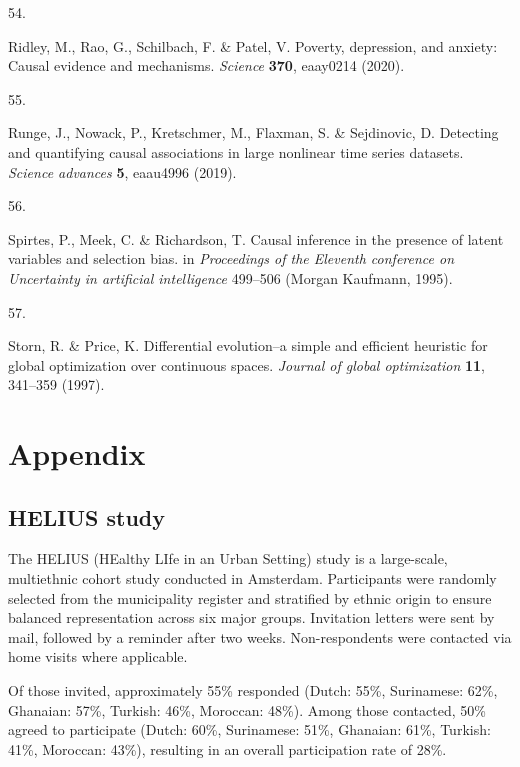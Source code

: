 \documentclass[
]{article}
\newlength{\cslhangindent}
\newlength{\csllabelwidth}
\newenvironment{CSLReferences}[2] %
 {\begin{list}{}{%
  \setlength{\itemindent}{0pt}
  \setlength{\leftmargin}{0pt}
  \setlength{\parsep}{0pt}
  \ifodd #1
   \setlength{\leftmargin}{\cslhangindent}
   \setlength{\itemindent}{-1\cslhangindent}
  \fi
  \setlength{\itemsep}{#2\baselineskip}}}
 {\end{list}}
\newcommand{\CSLLeftMargin}[1]{\parbox[t]{\csllabelwidth}{\strut#1\strut}}
\newcommand{\CSLRightInline}[1]{\parbox[t]{\linewidth - \csllabelwidth}{\strut#1\strut}}
\begin{document}
\begin{CSLReferences}{0}{0}
\CSLLeftMargin{54. }%
\CSLRightInline{Ridley, M., Rao, G., Schilbach, F. \& Patel, V. Poverty,
depression, and anxiety: Causal evidence and mechanisms. \emph{Science}
\textbf{370}, eaay0214 (2020).}

\CSLLeftMargin{55. }%
\CSLRightInline{Runge, J., Nowack, P., Kretschmer, M., Flaxman, S. \&
Sejdinovic, D. Detecting and quantifying causal associations in large
nonlinear time series datasets. \emph{Science advances} \textbf{5},
eaau4996 (2019).}

\CSLLeftMargin{56. }%
\CSLRightInline{Spirtes, P., Meek, C. \& Richardson, T. Causal inference
in the presence of latent variables and selection bias. in
\emph{Proceedings of the {Eleventh} conference on {Uncertainty} in
artificial intelligence} 499--506 (Morgan Kaufmann, 1995).}

\CSLLeftMargin{57. }%
\CSLRightInline{Storn, R. \& Price, K. Differential evolution--a simple
and efficient heuristic for global optimization over continuous spaces.
\emph{Journal of global optimization} \textbf{11}, 341--359 (1997).}

\end{CSLReferences}

\section{Appendix}\label{sec-appendix}

\subsection{HELIUS study}\label{sec-helius}

The HELIUS (HEalthy LIfe in an Urban Setting) study is a large-scale,
multiethnic cohort study conducted in Amsterdam. Participants were
randomly selected from the municipality register and stratified by
ethnic origin to ensure balanced representation across six major groups.
Invitation letters were sent by mail, followed by a reminder after two
weeks. Non-respondents were contacted via home visits where applicable.

Of those invited, approximately 55\% responded (Dutch: 55\%, Surinamese:
62\%, Ghanaian: 57\%, Turkish: 46\%, Moroccan: 48\%). Among those
contacted, 50\% agreed to participate (Dutch: 60\%, Surinamese: 51\%,
Ghanaian: 61\%, Turkish: 41\%, Moroccan: 43\%), resulting in an overall
participation rate of 28\%.
\end{document}
